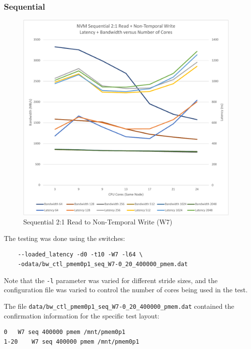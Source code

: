 \subsubsection{Sequential}

\begin{figure}
    \centering
    \caption{Sequential 2:1 Read to Non-Temporal Write (W7)}\label{chart:sequential:W7}
    \includegraphics[scale=0.5]{charts/sequential-w7-crop.pdf}
\end{figure}

The testing was done using the switches:

\begin{verbatim}
    --loaded_latency -d0 -t10 -W7 -l64 \
    -odata/bw_ctl_pmem0p1_seq_W7-0_20_400000_pmem.dat
\end{verbatim}

Note that the \verb+-l+ parameter was varied for different
stride sizes, and the configuration file was varied to control
the number of cores being used in the test.

The file \verb+data/bw_ctl_pmem0p1_seq_W7-0_20_400000_pmem.dat+ contained the confirmation information
for the specific test layout:

\begin{verbatim}
0	W7 seq 400000 pmem /mnt/pmem0p1
1-20	W7 seq 400000 pmem /mnt/pmem0p1
\end{verbatim}

